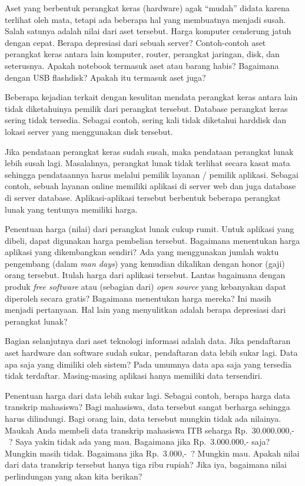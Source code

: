 Aset yang berbentuk perangkat keras (hardware) agak ``mudah'' didata karena
terlihat oleh mata, tetapi ada beberapa hal yang membuatnya menjadi susah.
Salah satunya adalah nilai dari aset tersebut. Harga komputer cenderung jatuh
dengan cepat. Berapa depresiasi dari sebuah server?  Contoh-contoh aset
perangkat keras antara lain komputer, router, perangkat jaringan, disk, dan
seterusnya. Apakah notebook termasuk aset atau barang habis? Bagaimana dengan
USB flashdisk? Apakah itu termasuk aset juga?

Beberapa kejadian terkait dengan kesulitan mendata perangkat keras antara lain
tidak diketahuinya pemilik dari perangkat tersebut. Database perangkat keras
sering tidak tersedia. Sebagai contoh, sering kali tidak diketahui harddisk dan
lokasi server yang menggunakan disk tersebut.

Jika pendataan perangkat keras sudah susah, maka pendataan perangkat lunak
lebih susah lagi. Masalahnya, perangkat lunak tidak terlihat secara kasat mata
sehingga pendataannya harus melalui pemilik layanan / pemilik aplikasi. Sebagai
contoh, sebuah layanan online memiliki aplikasi di server web dan juga database
di server database. Aplikasi-aplikasi tersebut berbentuk beberapa perangkat
lunak yang tentunya memiliki harga.

Penentuan harga (nilai) dari perangkat lunak cukup rumit. Untuk aplikasi yang
dibeli, dapat digunakan harga pembelian tersebut. Bagaimana menentukan harga
aplikasi yang dikembangkan sendiri? Ada yang menggunakan jumlah waktu
pengembang (dalam {\em man days}) yang kemudian dikalikan dengan honor (gaji)
orang tersebut. Itulah harga dari aplikasi tersebut. Lantas bagaimana dengan
produk {\em free software} atau (sebagian dari) {\em open source} yang
kebanyakan dapat diperoleh secara gratis? Bagaimana menentukan harga mereka?
Ini masih menjadi pertanyaan. Hal lain yang menyulitkan adalah berapa
depresiasi dari perangkat lunak?

Bagian selanjutnya dari aset teknologi informasi adalah data. Jika pendaftaran
aset hardware dan software sudah sukar, pendaftaran data lebih sukar lagi. Data
apa saja yang dimiliki oleh sistem? Pada umumnya data apa saja yang tersedia
tidak terdaftar. Masing-masing aplikasi hanya memiliki data tersendiri.

Penentuan harga dari data lebih sukar lagi. Sebagai contoh, berapa harga data
transkrip mahasiswa? Bagi mahasiswa, data tersebut sangat berharga sehingga
harus dilindungi. Bagi orang lain, data tersebut mungkin tidak ada nilainya.
Maukah Anda membeli data transkrip mahasiswa ITB seharga Rp.~30.000.000,-~?
Saya yakin tidak ada yang mau. Bagaimana jika Rp.~3.000.000,- saja? Mungkin
masih tidak. Bagaimana jika Rp.~3.000,-~? Mungkin mau. Apakah nilai dari data
transkrip tersebut hanya tiga ribu rupiah? Jika iya, bagaimana nilai
perlindungan yang akan kita berikan?


